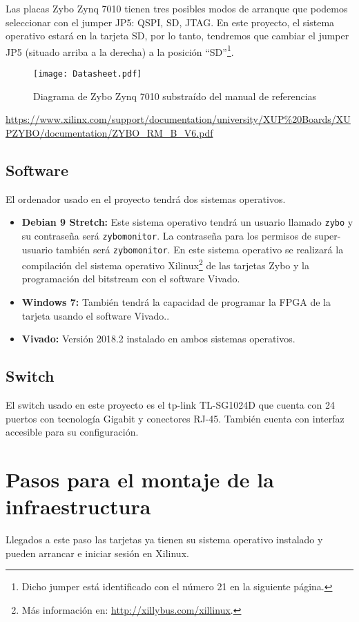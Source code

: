 \documentclass[12pt,letterpaper]{article}
\begin{document}
Las placas Zybo Zynq 7010 tienen tres posibles modos de arranque que podemos seleccionar con el jumper JP5: QSPI, SD, JTAG. En este proyecto, el sistema operativo estará en la tarjeta SD, por lo tanto, tendremos que cambiar el jumper JP5 (situado arriba a la derecha) a la posición ``SD''\footnote{Dicho jumper está identificado con el número 21 en la siguiente página.}.
\newpage
\begin{figure}[h]
	\centering
	\texttt{[image: Datasheet.pdf]}
	\caption{Diagrama de Zybo Zynq 7010 substraído del manual de referencias}
	\label{Datasheet}
\end{figure}
\noindent
\url{https://www.xilinx.com/support/documentation/university/XUP\%20Boards/XUPZYBO/documentation/ZYBO_RM_B_V6.pdf}

\newpage
\subsection{Software}
El ordenador usado en el proyecto tendrá dos sistemas operativos.
\begin{itemize}
	\item \textbf{Debian 9 Stretch:} Este sistema operativo tendrá un usuario llamado \texttt{zybo} y su contraseña será \texttt{zybomonitor}. La contraseña para los permisos de super-usuario también será \texttt{zybomonitor}. En este sistema operativo se realizará la compilación del sistema operativo Xilinux\footnote{Más información en: \url{http://xillybus.com/xillinux}.} de las tarjetas Zybo y la programación del bitstream con el software Vivado.
	\item \textbf{Windows 7:} También tendrá la capacidad de programar la FPGA de la tarjeta usando el software Vivado..
	\item \textbf{Vivado:} Versión 2018.2 instalado en ambos sistemas operativos.
\end{itemize}

\subsection{Switch}
El switch usado en este proyecto es el tp-link TL-SG1024D que cuenta con 24 puertos con tecnología Gigabit y conectores RJ-45. También cuenta con interfaz accesible para su configuración.


\section{Pasos para el montaje de la infraestructura}
Llegados a este paso las tarjetas ya tienen su sistema operativo instalado y pueden arrancar e iniciar sesión en Xilinux.
\end{document}
